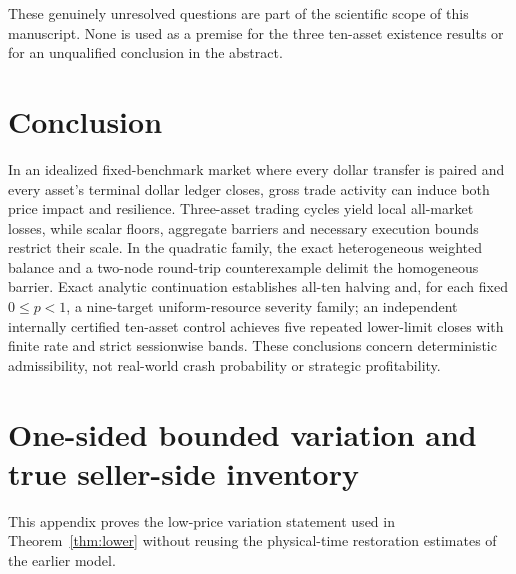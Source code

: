 \documentclass[review,hidelinks,onefignum,onetabnum]{siamonline250211}%
\begin{document}
These genuinely unresolved questions are part of
the scientific scope of this manuscript. None is used
as a premise for the three ten-asset existence results
or for an unqualified conclusion in the abstract.

\section{Conclusion}
In an idealized fixed-benchmark market where every dollar transfer
is paired and every asset's terminal dollar ledger closes, gross
trade activity can induce both price impact and resilience.
Three-asset trading cycles yield local all-market losses, while
scalar floors, aggregate barriers and necessary execution bounds
restrict their scale. In the quadratic family, the exact heterogeneous
weighted balance and a two-node round-trip counterexample delimit
the homogeneous barrier. Exact analytic continuation establishes
all-ten halving and, for each fixed $0\le p<1$, a nine-target
uniform-resource severity family;
an independent internally certified ten-asset control achieves
five repeated lower-limit closes with finite rate and strict
sessionwise bands. These conclusions concern deterministic
admissibility, not real-world crash probability or strategic
profitability.

\appendix

\section{One-sided bounded variation and true seller-side inventory}
\label{app:bv}
This appendix proves the low-price variation statement used in
Theorem~\ref{thm:lower} without reusing the physical-time
restoration estimates of the earlier model.
\end{document}
